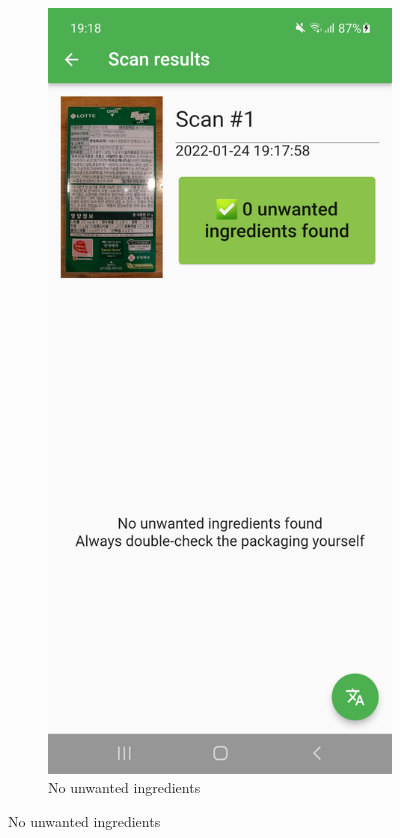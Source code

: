 \begin{figure}[h]
    \begin{subfigure}{0.5\textwidth}
        \centering
        \includegraphics[width=0.9\linewidth]{Figures/Screenshot/scan_pass.jpg} 
        \caption{No unwanted ingredients}

\end{subfigure}
\end{figure}
